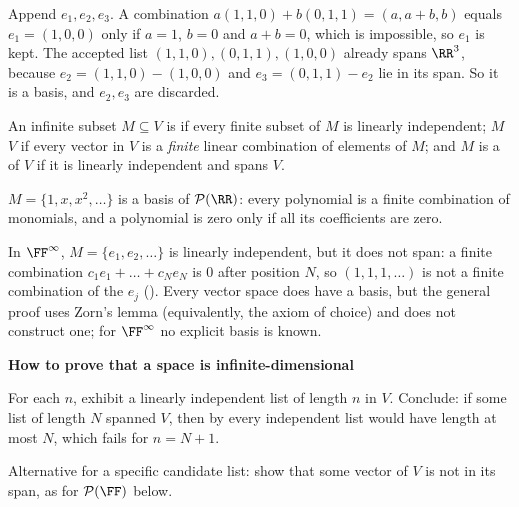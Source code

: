 \documentclass[10pt]{scrartcl}
\newcommand{\PP}{\mathcal P}
\newenvironment{methodbox}[1]{\begin{mdframed}[style=methodstyle]\textbf{\color{NavyBlue}#1}\par\vspace{2pt}}{\end{mdframed}}
\begin{document}
\begin{example*}
  Append $e_1,e_2,e_3$. A combination $a(1,1,0)+b(0,1,1)=(a,a+b,b)$ equals $e_1=(1,0,0)$ only if $a=1$, $b=0$ and $a+b=0$, which is impossible, so $e_1$ is kept. The accepted list $(1,1,0),(0,1,1),(1,0,0)$ already spans $\RR^3$, because $e_2=(1,1,0)-(1,0,0)$ and $e_3=(0,1,1)-e_2$ lie in its span. So it is a basis, and $e_2,e_3$ are discarded.
\end{example*}

\begin{definition*}
  An infinite subset $M\subseteq V$ is  if every finite subset of $M$ is linearly independent; $M$  $V$ if every vector in $V$ is a \emph{finite} linear combination of elements of $M$; and $M$ is a  of $V$ if it is linearly independent and spans $V$.
\end{definition*}

\begin{example*}[The monomials are a basis of $\PP(\RR)$ (Notes Ex.~12)]
  $M=\{1,x,x^2,\dots\}$ is a basis of $\PP(\RR)$: every polynomial is a finite combination of monomials, and a polynomial is zero only if all its coefficients are zero.
\end{example*}

\begin{example*}
  In $\FF^\infty$, $M=\{e_1,e_2,\dots\}$ is linearly independent, but it does not span: a finite combination $c_1e_1+\dots+c_Ne_N$ is $0$ after position $N$, so $(1,1,1,\dots)$ is not a finite combination of the $e_j$ (). Every vector space does have a basis, but the general proof uses Zorn's lemma (equivalently, the axiom of choice) and does not construct one; for $\FF^\infty$ no explicit basis is known.
\end{example*}

\begin{methodbox}{How to prove that a space is infinite-dimensional}
  \begin{steps}
    \ii For each $n$, exhibit a linearly independent list of length $n$ in $V$.
    \ii Conclude: if some list of length $N$ spanned $V$, then by  every independent list would have length at most $N$, which fails for $n=N+1$.
  \end{steps}
  Alternative for a specific candidate list: show that some vector of $V$ is not in its span, as for $\PP(\FF)$ below.
\end{methodbox}
\end{document}
